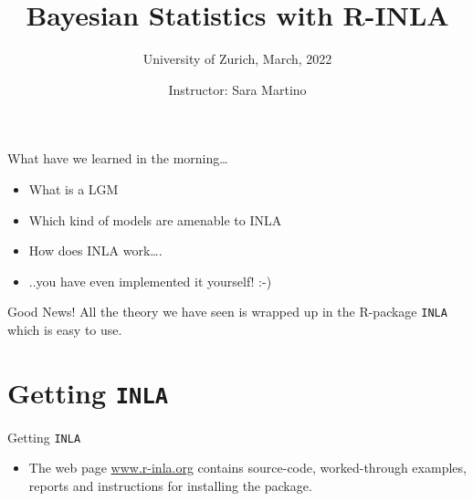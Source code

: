 \documentclass[
  ignorenonframetext,
]{beamer}
\title{Bayesian Statistics with R-INLA}
\subtitle{University of Zurich, March, 2022}
\author{Instructor: Sara Martino}
\date{}
\institute{Department of Mathematical Science (NTNU)}
\providecommand{\tightlist}{%
  \setlength{\itemsep}{0pt}\setlength{\parskip}{0pt}}
\begin{document}
\frame{\titlepage}

\begin{frame}[allowframebreaks]
  \tableofcontents[hideallsubsections]
\end{frame}
\begin{frame}
\end{frame}

\begin{frame}{What have we learned in the morning\ldots{}}
\protect\hypertarget{what-have-we-learned-in-the-morning}{}
\begin{itemize}
\item
  What is a LGM
\item
  Which kind of models are amenable to INLA
\item
  How does INLA work\ldots.
\end{itemize}

\pause

\begin{itemize}
\tightlist
\item
  ..you have even implemented it yourself! :-)
\end{itemize}
\end{frame}

\begin{frame}[fragile]{Good News!}
\protect\hypertarget{good-news}{}
\hfill\break
\hfill\break
\centering All the theory we have seen is wrapped up in the R-package
\texttt{INLA} which is easy to use.
\end{frame}

\hypertarget{getting-inla}{%
\section{\texorpdfstring{Getting
\texttt{INLA}}{Getting INLA}}\label{getting-inla}}

\begin{frame}{Getting \texttt{INLA}}
\protect\hypertarget{getting-inla-1}{}
\begin{itemize}
\tightlist
\item
  The web page \textcolor{red}{\url{www.r-inla.org}} contains
  source-code, worked-through examples, reports and instructions for
  installing the package.
\end{itemize}
\end{frame}
\end{document}
